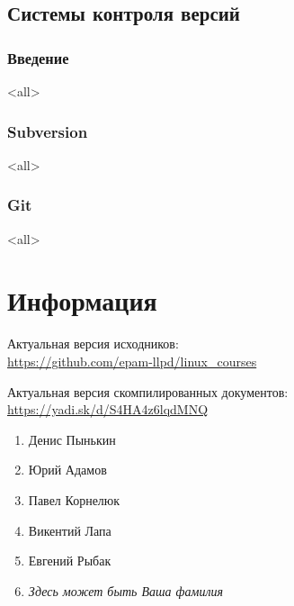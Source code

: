\chapter{Системы контроля версий}
\section{Введение}
\mode<all>{}
\section[SVN]{Subversion}
\mode<all>{}
\section{Git}
\mode<all>{}

\part*{Информация}

Актуальная версия исходников:\\
\url{https://github.com/epam-llpd/linux_courses}

Актуальная версия скомпилированных документов:\\
\url{https://yadi.sk/d/S4HA4z6lqdMNQ}

\bigskip

\begin{enumerate}
		\item Денис Пынькин
		\item Юрий Адамов
		\item Павел Корнелюк
		\item Викентий Лапа
		\item Евгений Рыбак
		\item {\it Здесь может быть Ваша фамилия}
\end{enumerate}


